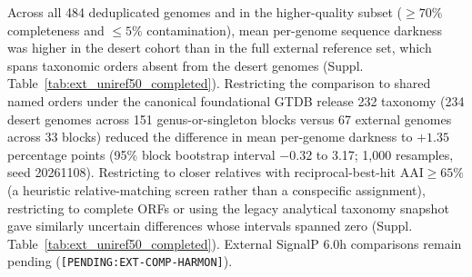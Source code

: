 Across all 484 deduplicated genomes and in the higher-quality subset ($\geq 70\%$ completeness and $\leq 5\%$ contamination), mean per-genome sequence darkness was higher in the desert cohort than in the full external reference set, which spans taxonomic orders absent from the desert genomes (Suppl. Table~\ref{tab:ext_uniref50_completed}). Restricting the comparison to shared named orders under the canonical foundational GTDB release 232 taxonomy (234 desert genomes across 151 genus-or-singleton blocks versus 67 external genomes across 33 blocks) reduced the difference in mean per-genome darkness to $+1.35$ percentage points (95\% block bootstrap interval $-0.32$ to 3.17; 1,000 resamples, seed 20261108). Restricting to closer relatives with reciprocal-best-hit $\mathrm{AAI}\geq 65\%$ (a heuristic relative-matching screen rather than a conspecific assignment), restricting to complete ORFs or using the legacy analytical taxonomy snapshot gave similarly uncertain differences whose intervals spanned zero (Suppl. Table~\ref{tab:ext_uniref50_completed}). External SignalP 6.0h comparisons remain pending (\texttt{[PENDING:\allowbreak EXT-COMP-HARMON]}).

